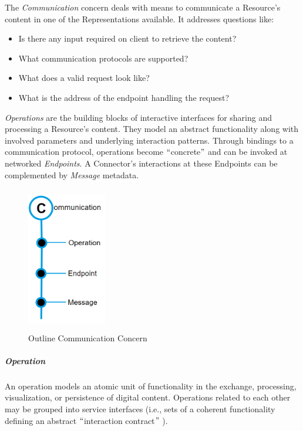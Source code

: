 The \textit{Communication }concern deals with means to communicate a Resource’s content in one of the Representations available. It addresses questions like:  \begin{itemize}
	\item Is there any input required on client to retrieve the content?  	
	\item What communication protocols are supported? 
 	\item What does a valid request look like? 
 	\item What is the address of the endpoint handling the request?
\end{itemize} 
 \textit{Operations} are the building blocks of interactive interfaces for sharing and processing a Resource’s content. They model an abstract functionality along with involved parameters and underlying interaction patterns. Through bindings to a communication protocol, operations become $``$concrete$"$  and can be invoked at networked \textit{Endpoints}. A Connector’s interactions at these Endpoints can be complemented by \textit{Message} metadata.


\begin{figure}[H]
	\begin{Center}
		\includegraphics[width=1.36in,height=2.5in]{./media/image39.png}
		\caption{Outline Communication Concern}
		\label{fig:outline_communication_concern}
	\end{Center}
\end{figure}



\subparagraph*{Operation}
An operation models an atomic unit of functionality in the exchange, processing, visualization, or persistence of digital content. Operations related to each other may be grouped into service interfaces (i.e., sets of a coherent functionality defining an abstract $``$interaction contract$"$ ). 

